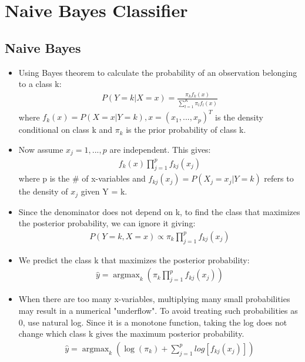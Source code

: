 \documentclass[12pt, oneside]{article}
\DeclareMathOperator*{\argmax}{argmax} %
\begin{document}
\newpage
\section{Naive Bayes Classifier}

\subsection{Naive Bayes}
\begin{itemize}

    \item Using Bayes theorem to calculate the probability of an observation belonging to a class k:
    \begin{align*}
        P(Y=k|X=x) = \frac{\pi_kf_k(x)}{\sum^K_{l=1}\pi_lf_l(x)}
    \end{align*}
    where $f_k(x) = P(X=x|Y=k), x = (x_1,...,x_p)^T$ is the density conditional on class k and $\pi_k$ is the prior probability of class k.
    \item Now assume $x_j= 1,...,p$ are independent. This gives:
    \begin{align*}
        f_k(x)\prod^p_{j=1}f_{kj}(x_j)
    \end{align*}
    where p is the \# of x-variables and $f_{kj}(x_j) = P(X_j = x_j|Y=k)$ refers to the density of $x_j$ given Y = k.
    \item Since the denominator does not depend on k, to find the class that maximizes the posterior probability, we can ignore it giving:
    \begin{align*}
        P(Y=k, X=x) \propto \pi_k\prod^p_{j=1}f_{kj}(x_j)
    \end{align*}
    \item We predict the class k that maximizes the posterior probability:
    \begin{align*}
        \widehat{y} = \argmax_k\left(\pi_k\prod^p_{j=1}f_{kj}(x_j)\right)
    \end{align*}
    \item When there are too many x-variables, multiplying many small probabilities may result in a numerical "underflow". To avoid treating such probabilities as 0, use natural log. Since it is a monotone function, taking the log does not change which class k gives the maximum posterior probability. 
    \begin{align*}
        \widehat{y} = \argmax_k\left(\log(\pi_k) + \sum^p_{j=1}log[f_{kj}(x_j)]\right)
    \end{align*}
\end{itemize}
\end{document}
